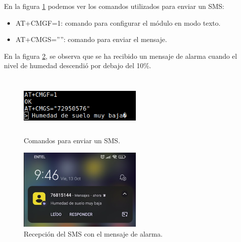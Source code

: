 En la figura \ref{fig:Comandos de envion SMS} podemos ver los comandos utilizados para enviar un SMS: 
\begin{itemize}
  \item AT+CMGF=1: comando para configurar el módulo en modo texto.
  \item AT+CMGS=””: comando para enviar el mensaje.  
\end{itemize}
En la figura \ref{fig:sms alarma}, se observa que se ha recibido un mensaje de alarma cuando el nivel de humedad descendió por debajo del 10\%.

\begin{figure}[h!]
  \centering
    \includegraphics[width=6cm, height=3cm]{./Figures/comandos_sms4.png}
  \caption{Comandos para enviar un SMS.}
    \label{fig:Comandos de envion SMS}
\end{figure}

\begin{figure}[h!]
  \centering
    \includegraphics[width=6cm, height=4cm]{./Figures/sms_alarma2.png}
  \caption{Recepción del SMS con el mensaje de alarma.}
    \label{fig:sms alarma}
\end{figure}

\label{sec:pruebasHW}